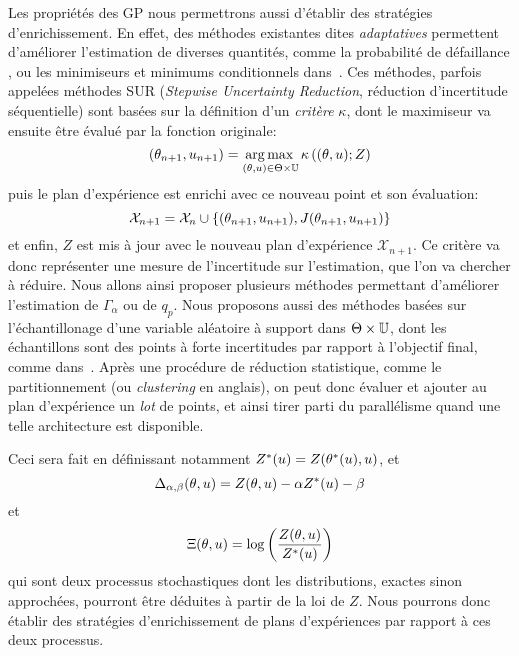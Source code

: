 \documentclass[../../Main_ManuscritThese.tex]{subfiles}
\begin{document}
Les propriétés des GP nous permettrons aussi d'établir des stratégies
d'enrichissement. En effet, des méthodes existantes dites
\emph{adaptatives} permettent d'améliorer l'estimation de diverses
quantités, comme la probabilité de défaillance
\cite{razaaly_rare_2019,moustapha_quantile-based_2016,bect_sequential_2012},
ou les minimiseurs et minimums conditionnels
dans~\cite{ginsbourger_bayesian_2014}. Ces méthodes, parfois appelées
méthodes SUR (\emph{Stepwise Uncertainty Reduction}, réduction
d'incertitude séquentielle) sont basées sur la définition d'un
\emph{critère} $\kappa$, dont le maximiseur va ensuite être évalué par la fonction
originale: 
\begin{equation*}
  (\theta_{n+1}, u_{n+1}) = \operatorname*{arg\,max \,}_{(\theta,u) \in \Theta\times\mathbb{U}} \kappa\left((\theta, u); Z\right)
\end{equation*}
puis le plan d'expérience est enrichi avec ce nouveau point et son évaluation:
\begin{equation}
\mathcal{X}_{n+1} = \mathcal{X}_n \cup \{(\theta_{n+1}, u_{n+1}), J(\theta_{n+1}, u_{n+1})\}
\end{equation}
et enfin, $Z$ est mis à jour avec le nouveau plan d'expérience
$\mathcal{X}_{n+1}$.  Ce critère va donc représenter une mesure de
l'incertitude sur l'estimation, que l'on va chercher à réduire. Nous
allons ainsi proposer plusieurs méthodes permettant d'améliorer
l'estimation de $\Gamma_{\alpha}$ ou de $q_p$.  Nous proposons aussi
des méthodes basées sur l'échantillonage d'une variable aléatoire à
support dans $\Theta\times \mathbb{U}$, dont les échantillons sont des
points à forte incertitudes par rapport à l'objectif final, comme
dans~\cite{echard_ak-mcs_2011,razaaly_rare_2019}. Après une procédure
de réduction statistique, comme le partitionnement (ou
\emph{clustering} en anglais), on peut donc évaluer et ajouter au plan
d'expérience un \emph{lot} de points, et ainsi tirer parti du
parallélisme quand une telle architecture est disponible.

Ceci sera fait en définissant notamment
$Z^*(u) = Z(\theta^*(u),u)$, et
\begin{equation*}
  \Delta_{\alpha,\beta}(\theta, u) = Z(\theta, u) - \alpha Z^*(u) - \beta
\end{equation*}
et
\begin{equation*}
  \Xi(\theta, u) = \log\left(\frac{Z(\theta, u)}{Z^*(u)}\right)
\end{equation*}
qui sont deux processus stochastiques dont les distributions, exactes
sinon approchées, pourront être déduites à partir de la loi de $Z$.
Nous pourrons donc établir des stratégies d'enrichissement de plans
d'expériences par rapport à ces deux processus.
\end{document}
